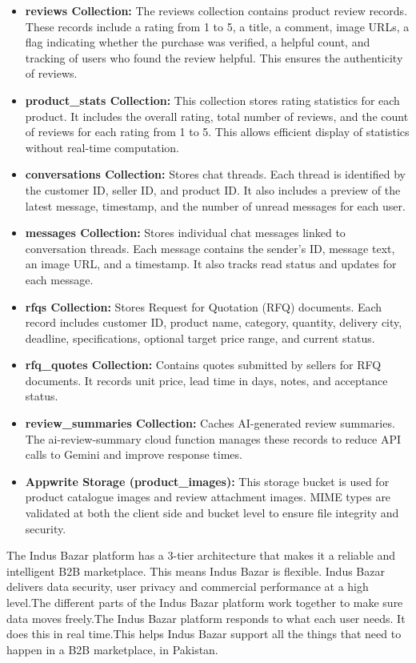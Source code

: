 \begin{itemize}
    \item \textbf{reviews Collection:} The reviews collection contains product review records. These records include a rating from 1 to 5, a title, a comment, image URLs, a flag indicating whether the purchase was verified, a helpful count, and tracking of users who found the review helpful. This ensures the authenticity of reviews.
    \item \textbf{product\_stats Collection:} This collection stores rating statistics for each product. It includes the overall rating, total number of reviews, and the count of reviews for each rating from 1 to 5. This allows efficient display of statistics without real-time computation.
    \item \textbf{conversations Collection:} Stores chat threads. Each thread is identified by the customer ID, seller ID, and product ID. It also includes a preview of the latest message, timestamp, and the number of unread messages for each user.
    \item \textbf{messages Collection:} Stores individual chat messages linked to conversation threads. Each message contains the sender's ID, message text, an image URL, and a timestamp. It also tracks read status and updates for each message.
   \item \textbf{rfqs Collection:} Stores Request for Quotation (RFQ) documents. Each record includes customer ID, product name, category, quantity, delivery city, deadline, specifications, optional target price range, and current status.
   \item \textbf{rfq\_quotes Collection:} Contains quotes submitted by sellers for RFQ documents. It records unit price, lead time in days, notes, and acceptance status.
   \item \textbf{review\_summaries Collection:} Caches AI-generated review summaries. The ai-review-summary cloud function manages these records to reduce API calls to Gemini and improve response times.
   \item \textbf{Appwrite Storage (product\_images):} This storage bucket is used for product catalogue images and review attachment images. MIME types are validated at both the client side and bucket level to ensure file integrity and security.
\end{itemize}
The Indus Bazar platform has a 3-tier architecture that makes it a reliable and intelligent B2B marketplace. This means Indus Bazar is flexible.
Indus Bazar delivers data security, user privacy and commercial performance at a high level.The different parts of the Indus Bazar platform work together to make sure data moves freely.The Indus Bazar platform responds to what each user needs. It does this in real time.This helps Indus Bazar support all the things that need to happen in a B2B marketplace, in Pakistan.

